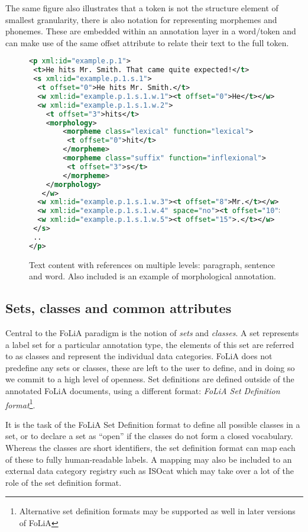 \documentclass[a4paper,10pt,twoside]{article}
\begin{document}
The same figure also illustrates that a token is not the structure element of
smallest granularity, there is also notation for representing morphemes and
phonemes. These are embedded within an annotation layer in a word/token and
can make use of the same offset attribute to relate their text to the full token.

\begin{figure}[tbh]
\begin{lstlisting}[language=xml]
<p xml:id="example.p.1">
 <t>He hits Mr. Smith. That came quite expected!</t>
 <s xml:id="example.p.1.s.1">
  <t offset="0">He hits Mr. Smith.</t>
  <w xml:id="example.p.1.s.1.w.1"><t offset="0">He</t></w>
  <w xml:id="example.p.1.s.1.w.2">
    <t offset="3">hits</t>
    <morphology> 
        <morpheme class="lexical" function="lexical">
         <t offset="0">hit</t>
        </morpheme>
        <morpheme class="suffix" function="inflexional">
         <t offset="3">s</t>
        </morpheme>
    </morphology>
   </w>
  <w xml:id="example.p.1.s.1.w.3"><t offset="8">Mr.</t></w>
  <w xml:id="example.p.1.s.1.w.4" space="no"><t offset="10">Smith</t></w>
  <w xml:id="example.p.1.s.1.w.5"><t offset="15">.</t></w>
 </s>
 ..
</p>
\end{lstlisting}
\caption{Text content with references on multiple levels: paragraph, sentence
and word. Also included is an example of morphological annotation.\label{fig:textcontent}}
\end{figure}


\subsection{Sets, classes and common attributes}

Central to the FoLiA paradigm is the notion of \emph{sets} and \emph{classes}.
A set represents a label set for a particular annotation type, the elements of
this set are referred to as classes and represent the individual data
categories. FoLiA does not predefine any sets or classes, these are left to the
user to define, and in doing so we commit to a high level of openness. Set
definitions are defined outside of the annotated FoLiA documents, using a
different format: \emph{FoLiA Set Definition format}\footnote{Alternative set
definition formats may be supported as well in later versions of FoLiA}.

It is the task of the FoLiA Set Definition format to define all possible
classes in a set, or to declare a set as ``open'' if the classes do not form a
closed vocabulary. Whereas the classes are short identifiers, the set
definition format can map each of these to fully human-readable labels. A
mapping may also be included to an external data category registry such as
ISOcat \cite{ISOCAT} which may take over a lot of the role of the set
definition format.
\end{document}
